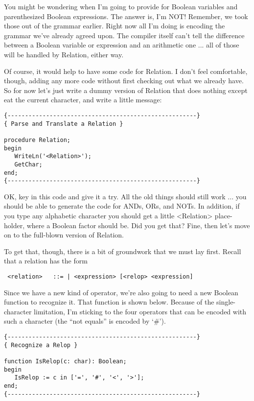 You  might be wondering when I'm going  to  provide  for  Boolean variables and parenthesized Boolean expressions. The  answer is, I'm NOT!   Remember, we  took  those out of the grammar earlier. Right now all I'm  doing  is  encoding  the grammar we've already agreed  upon. The compiler itself can't  tell  the  difference between a Boolean variable  or  expression  and an arithmetic one ... all of those will be handled by Relation, either way.

Of course, it would help to have some code for Relation. I don't feel comfortable, though, adding  any  more  code  without first checking out what we already have. So for now let's just write a dummy  version  of  Relation  that  does nothing except  eat  the current character, and write a little message:

\begin{verbatim}
{------------------------------------------------------}
{ Parse and Translate a Relation }

procedure Relation;
begin
   WriteLn('<Relation>');
   GetChar;
end;
{------------------------------------------------------}
\end{verbatim}

OK, key  in  this  code  and  give  it a try. All the old things should still work ... you should be able to generate the code for ANDs, ORs, and  NOTs. In  addition, if you type any alphabetic character you should get a little <Relation>  place-holder, where a  Boolean factor should be. Did you get that?  Fine, then let's move on to the full-blown version of Relation.

To  get  that, though, there is a bit of groundwork that we must lay first. Recall that a relation has the form

\begin{verbatim}
 <relation>   ::= | <expression> [<relop> <expression]
\end{verbatim}

Since  we have a new kind of operator, we're also going to need a new Boolean function to  recognize  it. That function is shown below. Because of the single-character limitation, I'm sticking to the four operators  that  can be encoded with such a character (the ``not equals'' is encoded by `\#').

\begin{verbatim}
{------------------------------------------------------}
{ Recognize a Relop }

function IsRelop(c: char): Boolean;
begin
   IsRelop := c in ['=', '#', '<', '>'];
end;
{------------------------------------------------------}
\end{verbatim}

